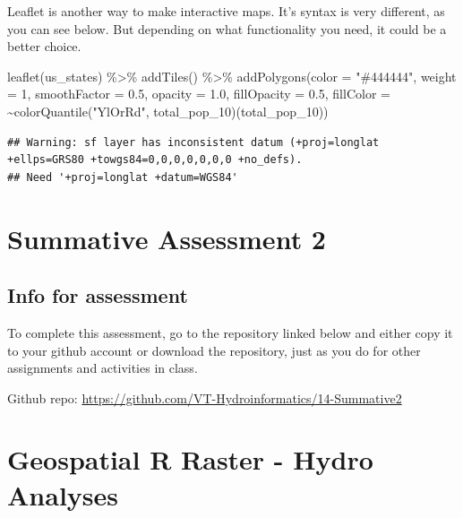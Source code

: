 \documentclass[
]{book}
\newenvironment{Shaded}{\begin{snugshade}}{\end{snugshade}}
\newcommand{\AttributeTok}[1]{\textcolor[rgb]{0.77,0.63,0.00}{#1}}
\newcommand{\DecValTok}[1]{\textcolor[rgb]{0.00,0.00,0.81}{#1}}
\newcommand{\FloatTok}[1]{\textcolor[rgb]{0.00,0.00,0.81}{#1}}
\newcommand{\FunctionTok}[1]{\textcolor[rgb]{0.00,0.00,0.00}{#1}}
\newcommand{\NormalTok}[1]{#1}
\newcommand{\SpecialCharTok}[1]{\textcolor[rgb]{0.00,0.00,0.00}{#1}}
\newcommand{\StringTok}[1]{\textcolor[rgb]{0.31,0.60,0.02}{#1}}
\begin{document}
Leaflet is another way to make interactive maps. It's syntax is very different, as you can see below. But depending on what functionality you need, it could be a better choice.

\begin{Shaded}
\begin{Highlighting}[]
\FunctionTok{leaflet}\NormalTok{(us\_states) }\SpecialCharTok{\%\textgreater{}\%} 
  \FunctionTok{addTiles}\NormalTok{() }\SpecialCharTok{\%\textgreater{}\%}
  \FunctionTok{addPolygons}\NormalTok{(}\AttributeTok{color =} \StringTok{"\#444444"}\NormalTok{, }\AttributeTok{weight =} \DecValTok{1}\NormalTok{, }\AttributeTok{smoothFactor =} \FloatTok{0.5}\NormalTok{,}
    \AttributeTok{opacity =} \FloatTok{1.0}\NormalTok{, }\AttributeTok{fillOpacity =} \FloatTok{0.5}\NormalTok{,}
    \AttributeTok{fillColor =} \SpecialCharTok{\textasciitilde{}}\FunctionTok{colorQuantile}\NormalTok{(}\StringTok{"YlOrRd"}\NormalTok{, total\_pop\_10)(total\_pop\_10))}
\end{Highlighting}
\end{Shaded}

\begin{verbatim}
## Warning: sf layer has inconsistent datum (+proj=longlat +ellps=GRS80 +towgs84=0,0,0,0,0,0,0 +no_defs).
## Need '+proj=longlat +datum=WGS84'
\end{verbatim}

\hypertarget{summative2}{%
\chapter{Summative Assessment 2}\label{summative2}}

\hypertarget{info-for-assessment}{%
\section{Info for assessment}\label{info-for-assessment}}

To complete this assessment, go to the repository linked below and either copy it to your github account or download the repository, just as you do for other assignments and activities in class.

Github repo: \url{https://github.com/VT-Hydroinformatics/14-Summative2}

\hypertarget{rgeoraster}{%
\chapter{Geospatial R Raster - Hydro Analyses}\label{rgeoraster}}
\end{document}
